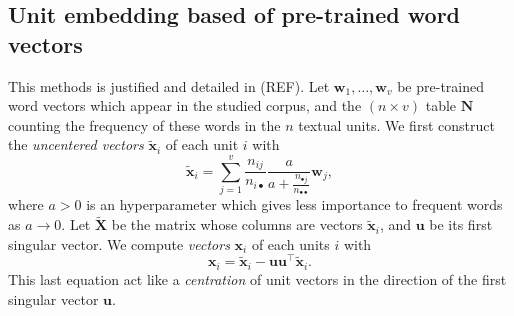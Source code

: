 \documentclass[
twocolumn,
]{ceurart}
\begin{document}
\subsection{Unit embedding based of pre-trained word vectors}
\label{wv_details}

This methods is justified and detailed in (REF). Let $\mathbf{w}_1, \ldots, \mathbf{w}_v$ be pre-trained word vectors which appear in the studied corpus, and the $(n \times v)$ table $\mathbf{N}$ counting the frequency of these words in the $n$ textual units. We first construct the \emph{uncentered vectors} $\widetilde{\mathbf{x}}_i$ of each unit $i$ with
\begin{equation}
\widetilde{\mathbf{x}}_i = \sum_{j = 1}^v \frac{n_{ij}}{n_{i \bullet}} \frac{a}{a + \frac{n_{\bullet j}}{n_{\bullet \bullet}}} \mathbf{w}_j,
\end{equation}
where $a > 0$ is an hyperparameter which gives less importance to frequent words as $a \to 0$. Let $\widetilde{\mathbf{X}}$ be the matrix whose columns are vectors $\widetilde{\mathbf{x}}_i$, and $\mathbf{u}$ be its first singular vector. We compute \emph{vectors} $\mathbf{x}_i$ of each units $i$ with
\begin{equation}
\mathbf{x}_i = \widetilde{\mathbf{x}}_i - \mathbf{u}\mathbf{u}^\top \widetilde{\mathbf{x}}_i.
\end{equation}
This last equation act like a \emph{centration} of unit vectors in the direction of the first singular vector $\mathbf{u}$.


\end{document}
